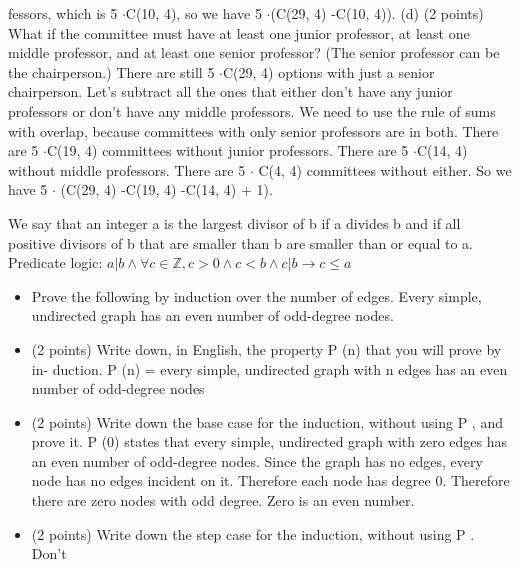 \documentclass[8pt]{article}
\begin{document}
\begin{paracol}{3}
\begin{itemize}[noitemsep]
            fessors, which is 5 $\cdot$C(10, 4), so we have 5 $\cdot$(C(29, 4) -C(10, 4)).
            (d) (2 points) What if the committee must have at least one junior professor, at least one
            middle professor, and at least one senior professor? (The senior professor can be the
            chairperson.)
            There are still 5 $\cdot$C(29, 4) options with just a senior chairperson. Let’s subtract all the
            ones that either don’t have any junior professors or don’t have any middle professors. We
            need to use the rule of sums with overlap, because committees with only senior professors
            are in both.
            There are 5 $\cdot$C(19, 4) committees without junior professors. There are 5 $\cdot$C(14, 4) without
            middle professors. There are 5 $\cdot$ C(4, 4) committees without either. So we have 5 $\cdot$
            (C(29, 4) -C(19, 4) -C(14, 4) + 1).
        \end{itemize}
        We say that an integer a is the largest
        divisor of b if a divides b and if all positive divisors of b that are smaller than b are
        smaller than or equal to a. \\
        Predicate logic: $a | b \wedge \forall c \in \mathbb{Z},c > 0\wedge c < b \wedge c | b \rightarrow c \leq a$
        \newline
        \newline
        \switchcolumn
        \begin{itemize}[noitemsep]
            \item Prove the following by induction over the number of edges. Every simple,
            undirected graph has an even number of odd-degree nodes.
            \item  (2 points) Write down, in English, the property P (n) that you will prove by in-
            duction.
            P (n) = every simple, undirected graph with n edges has an even number of odd-degree
            nodes
            \item  (2 points) Write down the base case for the induction, without using P , and prove
            it.
            P (0) states that every simple, undirected graph with zero edges has an even number
            of odd-degree nodes. Since the graph has no edges, every node has no edges incident
            on it. Therefore each node has degree 0. Therefore there are zero nodes with odd
            degree. Zero is an even number.
            \item  (2 points) Write down the step case for the induction, without using P . Don’t

\end{itemize}
\end{paracol}
\end{document}
